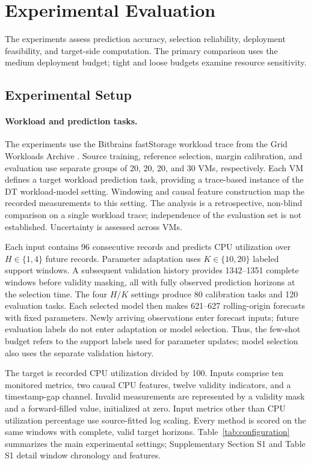 \documentclass[a4paper,fleqn]{cas-sc}
\begin{document}
\section{Experimental Evaluation}
\label{sec:experiments}
The experiments assess prediction accuracy, selection reliability, deployment
feasibility, and target-side computation. The primary comparison uses the
medium deployment budget; tight and loose budgets examine resource sensitivity.

\subsection{Experimental Setup}
\label{subsec:experimental-setup}
\paragraph{Workload and prediction tasks.}
The experiments use the Bitbrains fastStorage workload trace from the Grid
Workloads Archive \cite{refBitbrains,refGWA}. Source training, reference
selection, margin calibration, and evaluation use separate groups of 20, 20,
20, and 30 VMs, respectively. Each VM defines a target workload prediction
task, providing a trace-based instance of the DT workload-model setting.
Windowing and causal feature construction map the recorded measurements to
this setting. The analysis is a retrospective, non-blind comparison on a single
workload trace; independence of the evaluation set is not established.
Uncertainty is assessed across VMs.

Each input contains 96 consecutive records and predicts CPU utilization over
$H\in\{1,4\}$ future records. Parameter adaptation uses $K\in\{10,20\}$
labeled support windows. A subsequent validation history provides
1342--1351 complete windows before validity masking, all with fully observed
prediction horizons at the selection time. The four $H/K$ settings produce
80 calibration tasks and 120 evaluation tasks. Each selected model then makes
621--627 rolling-origin forecasts with fixed parameters. Newly arriving
observations enter forecast inputs; future evaluation labels do not enter
adaptation or model selection. Thus, the few-shot budget refers to the
support labels used for parameter updates; model selection also uses the
separate validation history.

The target is recorded CPU utilization divided by 100. Inputs comprise ten
monitored metrics, two causal CPU features, twelve validity indicators, and
a timestamp-gap channel. Invalid measurements are represented by a validity
mask and a forward-filled value, initialized at zero. Input metrics other than
CPU utilization percentage use source-fitted log scaling. Every method is
scored on the same windows with complete, valid target horizons.
Table~\ref{tab:configuration} summarizes the main experimental settings;
Supplementary Section S1 and Table S1 detail window chronology and features.
\end{document}
